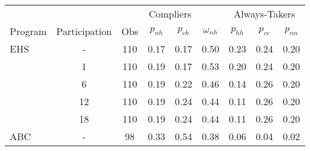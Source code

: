 \begin{tabular}{lcccccccc}
\toprule 
\midrule 
\multicolumn{3}{c}{} & \multicolumn{2}{c}{Compliers} &  & \multicolumn{3}{c}{Always-Takers} \\
 \cmidrule(lr){4-5} \cmidrule(lr){7-9} 
Program & Participation & Obs & $p_{nh}$ & $p_{ch}$ & $\omega_{nh}$ & $p_{hh}$ & $p_{cc}$ & $p_{nn}$ \\
\midrule 
EHS & - & 110 & 0.17 & 0.17 & 0.50 & 0.23 & 0.24 & 0.20 \\
 & 1 & 110 & 0.19 & 0.17 & 0.53 & 0.20 & 0.24 & 0.20 \\
 & 6 & 110 & 0.19 & 0.22 & 0.46 & 0.14 & 0.26 & 0.20 \\
 & 12 & 110 & 0.19 & 0.24 & 0.44 & 0.11 & 0.26 & 0.20 \\
 & 18 & 110 & 0.19 & 0.24 & 0.44 & 0.11 & 0.26 & 0.20 \\
ABC & - & 98 & 0.33 & 0.54 & 0.38 & 0.06 & 0.04 & 0.02 \\
\midrule 
\bottomrule 
\end{tabular}
